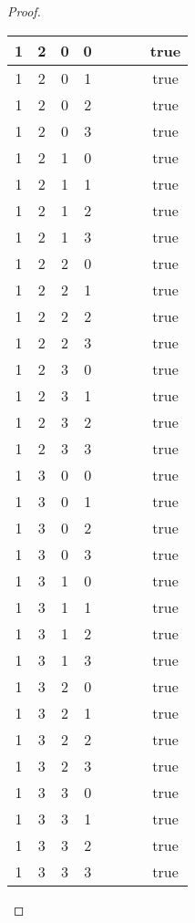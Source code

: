 \documentclass[10pt]{article}
\theoremstyle{definition}
\theoremstyle{plain}
\begin{document}
\begin{proof}
\begin{longtable}{|c|c|c|c|c|c|c|c|}
      1 & 2 & 0 & 0 &  &  &  & true \tabularnewline \hline
      1 & 2 & 0 & 1 &  &  &  & true \tabularnewline \hline
      1 & 2 & 0 & 2 &  &  &  & true \tabularnewline \hline
      1 & 2 & 0 & 3 &  &  &  & true \tabularnewline \hline
      1 & 2 & 1 & 0 &  &  &  & true \tabularnewline \hline
      1 & 2 & 1 & 1 &  &  &  & true \tabularnewline \hline
      1 & 2 & 1 & 2 &  &  &  & true \tabularnewline \hline
      1 & 2 & 1 & 3 &  &  &  & true \tabularnewline \hline
      1 & 2 & 2 & 0 &  &  &  & true \tabularnewline \hline
      1 & 2 & 2 & 1 &  &  &  & true \tabularnewline \hline
      1 & 2 & 2 & 2 &  &  &  & true \tabularnewline \hline
      1 & 2 & 2 & 3 &  &  &  & true \tabularnewline \hline
      1 & 2 & 3 & 0 &  &  &  & true \tabularnewline \hline
      1 & 2 & 3 & 1 &  &  &  & true \tabularnewline \hline
      1 & 2 & 3 & 2 &  &  &  & true \tabularnewline \hline
      1 & 2 & 3 & 3 &  &  &  & true \tabularnewline \hline
      1 & 3 & 0 & 0 &  &  &  & true \tabularnewline \hline
      1 & 3 & 0 & 1 &  &  &  & true \tabularnewline \hline
      1 & 3 & 0 & 2 &  &  &  & true \tabularnewline \hline
      1 & 3 & 0 & 3 &  &  &  & true \tabularnewline \hline
      1 & 3 & 1 & 0 &  &  &  & true \tabularnewline \hline
      1 & 3 & 1 & 1 &  &  &  & true \tabularnewline \hline
      1 & 3 & 1 & 2 &  &  &  & true \tabularnewline \hline
      1 & 3 & 1 & 3 &  &  &  & true \tabularnewline \hline
      1 & 3 & 2 & 0 &  &  &  & true \tabularnewline \hline
      1 & 3 & 2 & 1 &  &  &  & true \tabularnewline \hline
      1 & 3 & 2 & 2 &  &  &  & true \tabularnewline \hline
      1 & 3 & 2 & 3 &  &  &  & true \tabularnewline \hline
      1 & 3 & 3 & 0 &  &  &  & true \tabularnewline \hline
      1 & 3 & 3 & 1 &  &  &  & true \tabularnewline \hline
      1 & 3 & 3 & 2 &  &  &  & true \tabularnewline \hline
      1 & 3 & 3 & 3 &  &  &  & true \tabularnewline \hline


\end{longtable}
\end{proof}
\end{document}
